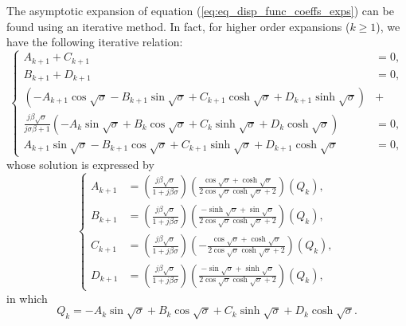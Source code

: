 \documentclass{article}
\begin{document}
The asymptotic expansion of equation (\ref{eq:eq_disp_func_coeffs_exps}) can be found using an iterative method. In fact, for higher order expansions ($k \geq 1$), we have the following iterative relation: 
\begin{equation}
    \left\{\begin{aligned}
        A_{k+1} + C_{k+1} &= 0, \\
        B_{k+1} + D_{k+1} &= 0, \\
        \left( - A_{k+1} \cos{\sqrt{\sigma}} - B_{k+1} \sin{\sqrt{\sigma}} + C_{k+1} \cosh{\sqrt{\sigma}} + D_{k+1} \sinh{\sqrt{\sigma}} \right) &+ \\
        \frac{j \beta \sqrt{\sigma}}{ j\sigma \beta + 1 } \left( - A_{k} \sin{\sqrt{\sigma}} + B_{k} \cos{\sqrt{\sigma}} + C_{k} \sinh{\sqrt{\sigma}} + D_{k} \cosh{\sqrt{\sigma}} \right) &= 0, \\
        A_{k+1} \sin{\sqrt{\sigma}} - B_{k+1} \cos{\sqrt{\sigma}} + C_{k+1} \sinh{\sqrt{\sigma}} + D_{k+1} \cosh{\sqrt{\sigma}} &= 0,
    \end{aligned}\right.
\end{equation}
whose solution is expressed by
\begin{equation}
    \left\{\begin{aligned}
        A_{k+1} &= \left( \frac{j \beta \sqrt{\sigma }}{1+j \beta \sigma } \right) \left(\frac{\cos\sqrt{\sigma }+\cosh\sqrt{\sigma }}{2 \cos\sqrt{\sigma }\cosh\sqrt{\sigma }+2} \right) \left( Q_k \right), \\
        B_{k+1} &= \left( \frac{j \beta \sqrt{\sigma }}{1+j \beta \sigma } \right) \left( \frac{-\sinh\sqrt{\sigma }+\sin\sqrt{\sigma }}{2 \cos\sqrt{\sigma }\cosh\sqrt{\sigma }+2} \right) \left( Q_k \right), \\
        C_{k+1} &= \left( \frac{j \beta \sqrt{\sigma }}{1+j \beta \sigma } \right) \left( -\frac{\cos\sqrt{\sigma }+\cosh\sqrt{\sigma }}{2 \cos\sqrt{\sigma } \cosh\sqrt{\sigma }+2} \right) \left( Q_k \right), \\
        D_{k+1} &= \left( \frac{j \beta \sqrt{\sigma }}{1+j \beta \sigma } \right) \left( \frac{-\sin\sqrt{\sigma }+\sinh\sqrt{\sigma }}{2 \cos\sqrt{\sigma }\cosh\sqrt{\sigma }+2} \right) \left( Q_k \right), 
    \end{aligned}\right.
\end{equation}
in which
\begin{equation}
    Q_k = - A_{k} \sin{\sqrt{\sigma}} + B_{k} \cos{\sqrt{\sigma}} + C_{k} \sinh{\sqrt{\sigma}} + D_{k} \cosh{\sqrt{\sigma}}.
\end{equation}
\end{document}
